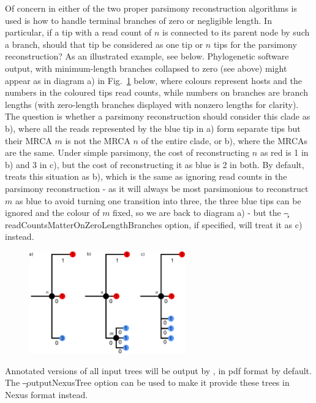 Of concern in either of the two proper parsimony reconstruction algorithms is used is how to handle terminal branches of zero or negligible length.
In particular, if a tip with a read count of $n$ is connected to its parent node by such a branch, should that tip be considered as one tip or $n$ tips for the parsimony reconstruction? As an illustrated example, see below.
Phylogenetic software output, with minimum-length branches collapsed to zero (see above) might appear as in diagram a) in Fig.~\ref{fig:ZeroLengthBranches} below, where colours represent hosts and the numbers in the coloured tips read counts, while numbers on branches are branch lengths (with zero-length branches displayed with nonzero lengths for clarity).
The question is whether a parsimony reconstruction should consider this clade as b), where all the reads represented by the blue tip in a) form separate tips but their MRCA $m$ is not the MRCA $n$ of the entire clade, or b), where the MRCAs are the same.
Under simple parsimony, the cost of reconstructing $n$ as red is 1 in b) and 3 in c), but the cost of reconstructing it as blue is 2 in both.
By default, \pat treats this situation as b), which is the same as ignoring read counts in the parsimony reconstruction - as it will always be most parsimonious to reconstruct $m$ as blue to avoid turning one transition into three, the three blue tips can be ignored and the colour of $m$ fixed, so we are back to diagram a) - but the \c{--readCountsMatterOnZeroLengthBranches} option, if specified, will treat it as c) instead.

\begin{figure}[!h]
\centering
\includegraphics[width=0.6\textwidth]{manualfigure.pdf}
\label{fig:ZeroLengthBranches}
\end{figure}

Annotated versions of all input trees will be output by \pat, in pdf format by default.
The \c{--outputNexusTree} option can be used to make it provide these trees in Nexus format instead.

